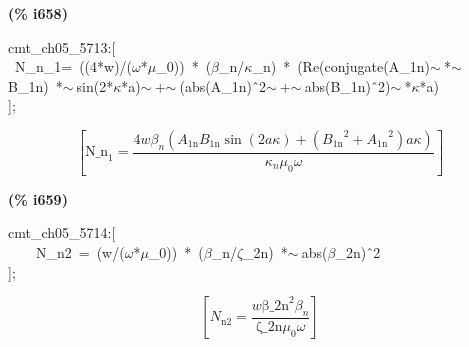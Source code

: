 \documentclass[fleqn]{article}
\begin{document}
\noindent
\begin{minipage}[t]{4.000000em}\color{red}\bfseries
(\% i658)	
\end{minipage}
\begin{minipage}[t]{\textwidth}\color{blue}
cmt\_ch05\_5713:[\\
\ N\_n\_1=\ ((4*w)/(\ensuremath{\omega}*\ensuremath{\mu}\_0))\ *\ (\ensuremath{\beta}\_n/\ensuremath{\kappa}\_n)\ *\ (Re(conjugate(A\_1n)\ensuremath{\sim\ }*\ensuremath{\sim\ }B\_1n)\ *\ensuremath{\sim\ }sin(2*\ensuremath{\kappa}*a)\ensuremath{\sim\ }+\ensuremath{\sim\ }(abs(A\_1n)\^\ 2\ensuremath{\sim\ }+\ensuremath{\sim\ }abs(B\_1n)\^\ 2)\ensuremath{\sim\ }*\ensuremath{\kappa}*a)\\
];
\end{minipage}
\[\displaystyle \tag{\% o658} 
\left[ {{\ensuremath{\mathrm{N\_ n}}}_1}=\frac{4 w {{\beta }_n} \left( {A_{\ensuremath{\mathrm{1n}}}} {B_{\ensuremath{\mathrm{1n}}}} \sin{\left( 2 a \kappa \right) }+\left( {{{B_{\ensuremath{\mathrm{1n}}}}}^{2}}+{{{A_{\ensuremath{\mathrm{1n}}}}}^{2}}\right)  a \kappa \right) }{{{\kappa }_n} {{\mu }_0} \omega }\right] \mbox{}
\]


\noindent
\begin{minipage}[t]{4.000000em}\color{red}\bfseries
(\% i659)	
\end{minipage}
\begin{minipage}[t]{\textwidth}\color{blue}
cmt\_ch05\_5714:[\\
\ \ \ \ N\_n2\ =\ (w/(\ensuremath{\omega}*\ensuremath{\mu}\_0))\ *\ (\ensuremath{\beta}\_n/\ensuremath{\zeta}\_2n)\ *\ensuremath{\sim\ }abs(\ensuremath{\beta}\_2n)\^\ 2\\
];
\end{minipage}
\[\displaystyle \tag{\% o659} 
\left[ {N_{\ensuremath{\mathrm{n2}}}}=\frac{w {{\ensuremath{\mathrm{\beta \_ 2n}}}^{2}} {{\beta }_n}}{\ensuremath{\mathrm{\zeta \_ 2n}} {{\mu }_0} \omega }\right] \mbox{}
\]
\end{document}
